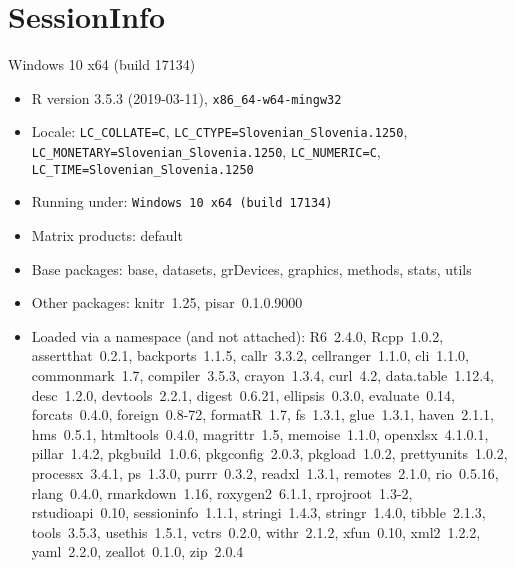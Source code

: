 \documentclass[a4paper,12pt]{article}\usepackage[]{graphicx}\usepackage[]{color}
\begin{document}
\clearpage
\section*{SessionInfo}
Windows 10 x64 (build 17134) 
\begin{itemize}\raggedright
  \item R version 3.5.3 (2019-03-11), \verb|x86_64-w64-mingw32|
  \item Locale: \verb|LC_COLLATE=C|, \verb|LC_CTYPE=Slovenian_Slovenia.1250|, \verb|LC_MONETARY=Slovenian_Slovenia.1250|, \verb|LC_NUMERIC=C|, \verb|LC_TIME=Slovenian_Slovenia.1250|
  \item Running under: \verb|Windows 10 x64 (build 17134)|
  \item Matrix products: default
  \item Base packages: base, datasets, grDevices, graphics,
    methods, stats, utils
  \item Other packages: knitr~1.25, pisar~0.1.0.9000
  \item Loaded via a namespace (and not attached): R6~2.4.0,
    Rcpp~1.0.2, assertthat~0.2.1, backports~1.1.5,
    callr~3.3.2, cellranger~1.1.0, cli~1.1.0, commonmark~1.7,
    compiler~3.5.3, crayon~1.3.4, curl~4.2, data.table~1.12.4,
    desc~1.2.0, devtools~2.2.1, digest~0.6.21, ellipsis~0.3.0,
    evaluate~0.14, forcats~0.4.0, foreign~0.8-72, formatR~1.7,
    fs~1.3.1, glue~1.3.1, haven~2.1.1, hms~0.5.1,
    htmltools~0.4.0, magrittr~1.5, memoise~1.1.0,
    openxlsx~4.1.0.1, pillar~1.4.2, pkgbuild~1.0.6,
    pkgconfig~2.0.3, pkgload~1.0.2, prettyunits~1.0.2,
    processx~3.4.1, ps~1.3.0, purrr~0.3.2, readxl~1.3.1,
    remotes~2.1.0, rio~0.5.16, rlang~0.4.0, rmarkdown~1.16,
    roxygen2~6.1.1, rprojroot~1.3-2, rstudioapi~0.10,
    sessioninfo~1.1.1, stringi~1.4.3, stringr~1.4.0,
    tibble~2.1.3, tools~3.5.3, usethis~1.5.1, vctrs~0.2.0,
    withr~2.1.2, xfun~0.10, xml2~1.2.2, yaml~2.2.0,
    zeallot~0.1.0, zip~2.0.4
\end{itemize}
\end{document}
